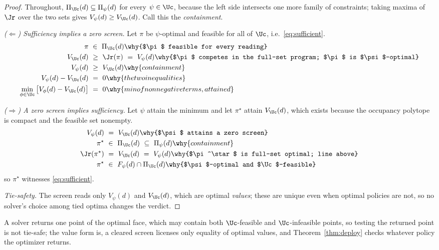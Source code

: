 \begin{proof}
Throughout, $\Pi_{\Uc}(d)\subseteq\Pi_\psi(d)$ for every $\psi\in\Uc$,
because the left side intersects one more family of constraints; taking
maxima of $\Jr$ over the two sets gives $V_\psi(d)\ge V_{\Uc}(d)$. Call
this the \emph{containment}.

\emph{($\Leftarrow$) Sufficiency implies a zero screen.} Let $\pi$ be
$\psi$-optimal and feasible for all of $\Uc$, i.e.\ \eqref{eq:sufficient}.
\begin{align*}
\pi\ &\in\ \Pi_{\Uc}(d) \why{$\pi$ feasible for every reading}\\
V_{\Uc}(d)\ &\ge\ \Jr(\pi)\ =\ V_\psi(d)
   \why{$\pi$ competes in the full-set program; $\pi$ is $\psi$-optimal}\\
V_\psi(d)\ &\ge\ V_{\Uc}(d) \why{containment}\\
V_\psi(d)-V_{\Uc}(d)\ &=\ 0
   \why{the two inequalities}\\
\min_{\phi\in\Uc}\big[V_\phi(d)-V_{\Uc}(d)\big]\ &=\ 0
   \why{min of nonnegative terms, attained}
\end{align*}

\emph{($\Rightarrow$) A zero screen implies sufficiency.} Let $\psi$ attain
the minimum and let $\pi^\star$ attain $V_{\Uc}(d)$, which exists because
the occupancy polytope is compact and the feasible set nonempty.
\begin{align*}
V_\psi(d)\ &=\ V_{\Uc}(d) \why{$\psi$ attains a zero screen}\\
\pi^\star\ &\in\ \Pi_{\Uc}(d)\ \subseteq\ \Pi_\psi(d)
   \why{containment}\\
\Jr(\pi^\star)\ &=\ V_{\Uc}(d)\ =\ V_\psi(d)
   \why{$\pi^\star$ is full-set optimal; line above}\\
\pi^\star\ &\in\ F_\psi(d)\cap\Pi_{\Uc}(d)
   \why{$\psi$-optimal and $\Uc$-feasible}
\end{align*}
so $\pi^\star$ witnesses \eqref{eq:sufficient}.

\emph{Tie-safety.} The screen reads only $V_\psi(d)$ and $V_{\Uc}(d)$, which
are optimal \emph{values}; these are unique even when optimal policies are
not, so no solver's choice among tied optima changes the verdict.
\end{proof}

\noindent A solver returns one point of the optimal face, which may contain both $\Uc$-feasible
and $\Uc$-infeasible points, so testing the returned point is not tie-safe; the value form is,
a cleared screen licenses only equality of optimal values, and Theorem~\ref{thm:deploy} checks
whatever policy the optimizer returns.

